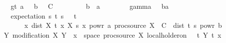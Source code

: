 \begin{isabellebody}
{\ \ \ \ \ \ \ gt{\isacharunderscore}{\kern0pt}{}{\isacharcolon}{\kern0pt}\ {\isachardoublequoteopen}a\ {\isachargreater}{\kern0pt}\ {}{\isachardoublequoteclose}\ {\isachardoublequoteopen}b\ {\isachargreater}{\kern0pt}\ {}{\isachardoublequoteclose}\ {\isachardoublequoteopen}C\ {\isachargreater}{\kern0pt}\ {}{\isachardoublequoteclose}\isanewline
\ \ \ \ \ \ \ {\isachardoublequoteopen}b\ {\isasymle}\ a{\isachardoublequoteclose}\ \isanewline
\ \ \ \ \ \ \ gamma{\isacharcolon}{\kern0pt}\ {\isachardoublequoteopen}{\isasymgamma}\ {\isasymin}\ {\isacharbraceleft}{\kern0pt}{}{\isacharless}{\kern0pt}{\isachardot}{\kern0pt}{\isachardot}{\kern0pt}{\isacharless}{\kern0pt}b{\isacharslash}{\kern0pt}a{\isacharbraceright}{\kern0pt}{\isachardoublequoteclose}\isanewline
\ \ \ \ \ \ \ expectation{\isacharcolon}{\kern0pt}\ {\isachardoublequoteopen}{\isasymAnd}s\ t{\isachardot}{\kern0pt}\ {\isasymlbrakk}s\ {\isasymge}\ {}{\isacharsemicolon}{\kern0pt}\ t\ {\isasymge}\ {}{\isasymrbrakk}\ {\isasymLongrightarrow}\isanewline
\ \ \ \ \ \ \ \ \ \ {\isacharparenleft}{\kern0pt}{\isasymintegral}\isactrlsup {\isacharplus}{\kern0pt}\ x{\isachardot}{\kern0pt}\ dist\ {\isacharparenleft}{\kern0pt}X\ t\ x{\isacharparenright}{\kern0pt}\ {\isacharparenleft}{\kern0pt}X\ s\ x{\isacharparenright}{\kern0pt}\ powr\ a\ {\isasympartial}proc{\isacharunderscore}{\kern0pt}source\ X{\isacharparenright}{\kern0pt}\ {\isasymle}\ C\ {\isacharasterisk}{\kern0pt}\ dist\ t\ s\ powr\ {\isacharparenleft}{\kern0pt}{}{\isacharplus}{\kern0pt}b{\isacharparenright}{\kern0pt}{\isachardoublequoteclose}\isanewline
\ \ \ \ \ {\isachardoublequoteopen}{\isasymexists}Y{\isachardot}{\kern0pt}\ modification\ X\ Y\ {\isasymand}\ {\isacharparenleft}{\kern0pt}{\isasymforall}x\ {\isasymin}\ space\ {\isacharparenleft}{\kern0pt}proc{\isacharunderscore}{\kern0pt}source\ X{\isacharparenright}{\kern0pt}{\isachardot}{\kern0pt}\ local{\isacharunderscore}{\kern0pt}holder{\isacharunderscore}{\kern0pt}on\ {\isasymgamma}\ {\isacharbraceleft}{\kern0pt}{}{\isachardot}{\kern0pt}{\isachardot}{\kern0pt}{\isacharbraceright}{\kern0pt}\ {\isacharparenleft}{\kern0pt}{\isasymlambda}t{\isachardot}{\kern0pt}\ Y\ t\ x{\isacharparenright}{\kern0pt}{\isacharparenright}{\kern0pt}{\isachardoublequoteclose}%
}%
%
\isadelimproof
%
\endisadelimproof
%
\isatagproof
{}\isamarkupfalse%
\ {\isacharminus}{\kern0pt}\isanewline
\ \ \isamarkupfalse%

\end{isabellebody}
